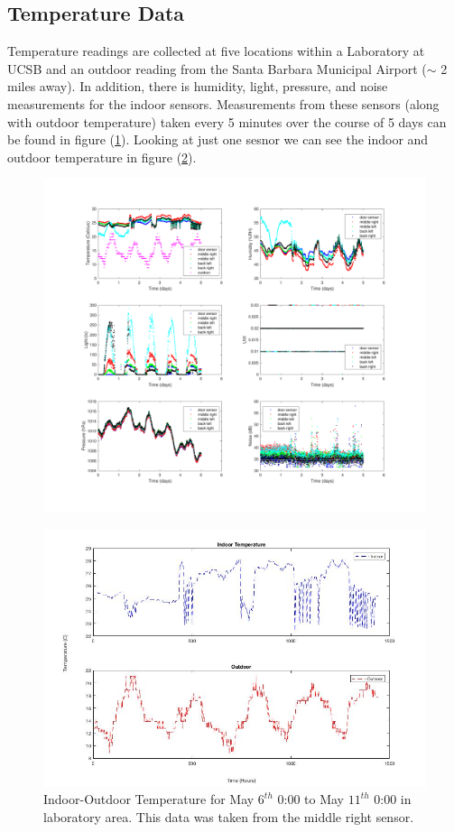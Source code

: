 \documentclass{article}
\begin{document}
\subsection*{Temperature Data\autocite[7]{boskic}}
Temperature readings are collected at five locations within a Laboratory at UCSB and an outdoor reading from the Santa Barbara Municipal Airport (\(\sim\) 2 miles away). In addition, there is humidity, light, pressure, and noise measurements for the indoor sensors. Measurements from these sensors (along with outdoor temperature) taken every 5 minutes over the course of 5 days can be found in figure (\ref{SigsFromSens}). Looking at just one sesnor we can see the indoor and outdoor temperature in figure (\ref{SensorInOutMode2l}).
\begin{figure}[!ht]
	\centering
	\includegraphics[scale=0.3]{Figures/Signals.pdf}
	\caption{}\label{SigsFromSens}
\end{figure}

\begin{figure} [!ht]
	\centering
	\includegraphics[scale=0.3]{Figures/sensorinout.jpg}
	\caption{Indoor-Outdoor Temperature for May $6^{th}$ 0:00 to May $11^{th}$ 0:00 in laboratory area. This data was taken from the middle right sensor.}
	\label{SensorInOutMode2l}
\end{figure}
\end{document}
